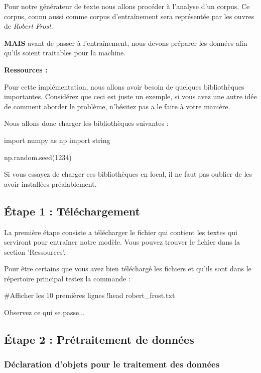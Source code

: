\vspace{0.5cm}
Pour notre générateur de texte nous allons procéder à l’analyse d'un corpus. Ce corpus, connu aussi comme corpus d'entraînement sera représentée par les ouvres de \textit{Robert Frost}.

\textbf{MAIS} avant de passer à l'entraînement, nous devons préparer les données afin qu'ils soient traitables pour la machine.

\textbf{Ressources : }

Pour cette implémentation, nous allons avoir besoin de quelques bibliothèques importantes. Considérez que ceci est juste un exemple, si vous avez une autre idée de comment aborder le problème, n’hésitez pas a le faire à votre manière.

Nous allons donc charger les bibliothèques suivantes :

\begin{python}
import numpy as np
import string

np.random.seed(1234)
\end{python}

Si vous essayez de charger ces bibliothèques en local, il ne faut pas oublier de les avoir installées préalablement.

\vspace{0.5cm}

\subsection{Étape 1 : Téléchargement}

La première étape consiste a télécharger le fichier qui contient les textes qui serviront pour entraîner notre modèle. Vous pouvez trouver le fichier dans la section 'Ressources'.

Pour être certains que vous avez bien téléchargé les fichiers et qu'ils sont dans le répertoire principal testez la commande :

\begin{python} 
#Afficher les 10 premières lignes
!head robert_frost.txt 
\end{python}

Observez ce qui se passe...

\subsection{Étape 2 : Prétraitement de données}

\subsubsection{Déclaration d'objets pour le traitement des données}

